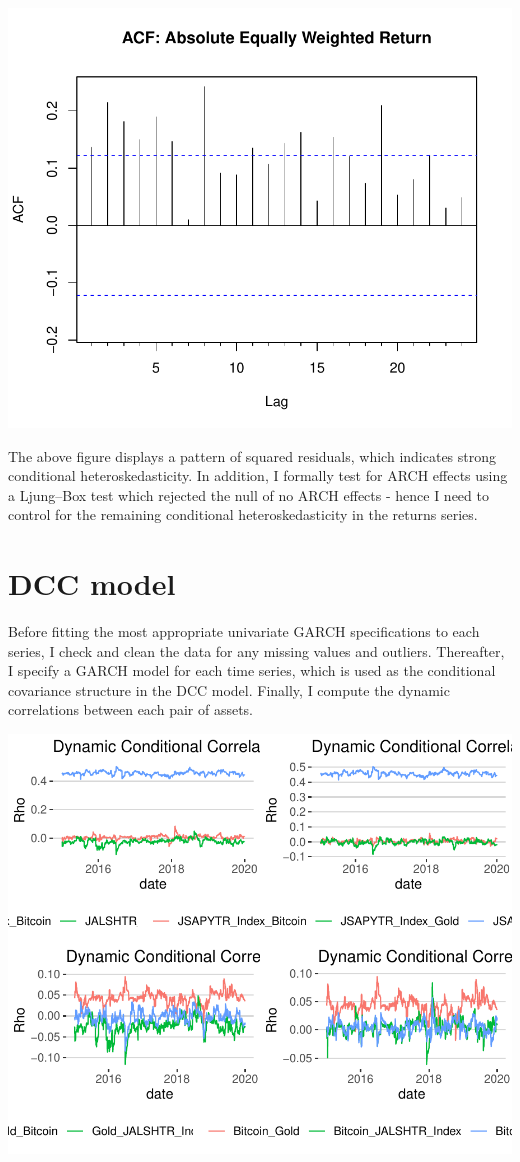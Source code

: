 \documentclass[11pt,preprint, authoryear]{elsarticle}
\numberwithin{equation}{section}
\numberwithin{figure}{section}
\numberwithin{table}{section}
\begin{document}
\includegraphics{FinMetrics-Essay_files/figure-latex/unnamed-chunk-6-1.pdf}

The above figure displays a pattern of squared residuals, which
indicates strong conditional heteroskedasticity. In addition, I formally
test for ARCH effects using a Ljung--Box test which rejected the null of
no ARCH effects - hence I need to control for the remaining conditional
heteroskedasticity in the returns series.

\hypertarget{dcc-model}{%
\section{DCC model}\label{dcc-model}}

Before fitting the most appropriate univariate GARCH specifications to
each series, I check and clean the data for any missing values and
outliers. Thereafter, I specify a GARCH model for each time series,
which is used as the conditional covariance structure in the DCC model.
Finally, I compute the dynamic correlations between each pair of assets.

\includegraphics{FinMetrics-Essay_files/figure-latex/unnamed-chunk-8-1.pdf}
\end{document}
